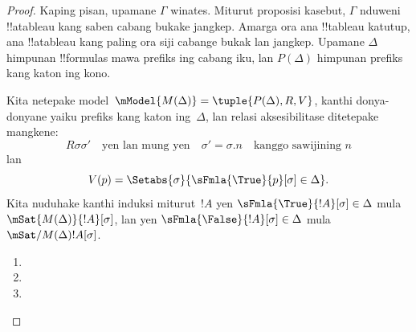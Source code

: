 \documentclass[../../../include/open-logic-section]{subfiles}
\begin{document}
\begin{proof}
Kaping pisan, upamane $\Gamma$ winates. Miturut proposisi kasebut,
$\Gamma$ nduweni !!a{tableau} kang saben cabang bukake jangkep.
Amarga ora ana !!{tableau} katutup, ana !!a{tableau}
kang paling ora siji cabange bukak lan jangkep. Upamane $\Delta$
himpunan !!{formula}s mawa prefiks ing cabang iku, lan $P(\Delta)$
himpunan prefiks kang katon ing kono.

Kita netepake model~$\mModel{M(\Delta)} = \tuple{P(\Delta), R, V}$,
kanthi donya-donyane yaiku prefiks kang katon ing~$\Delta$, lan relasi
aksesibilitase ditetepake mangkene:
\[
R\sigma\sigma' \quad \text{yen lan mung yen} \quad
\sigma'=\sigma.n \quad \text{kanggo sawijining~$n$}
\]
lan
\[
V(p) = \Setabs{\sigma}{\sFmla{\True}{p}[\sigma] \in \Delta}.
\]
Kita nuduhake kanthi induksi miturut~$!A$ yen
$\sFmla{\True}{!A}[\sigma] \in \Delta$ mula
$\mSat{M(\Delta)}{!A}[\sigma]$, lan yen
$\sFmla{\False}{!A}[\sigma] \in \Delta$ mula
$\mSat/{M(\Delta)}{!A}[\sigma]$.

\begin{enumerate}
  \item {}
  \item {}
  \item {}
\end{enumerate}
\end{proof}
\end{document}
